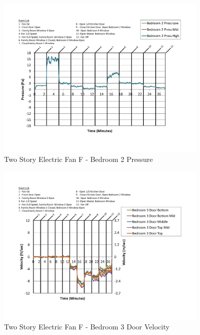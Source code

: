 \documentclass{article}
\begin{document}
\begin{appendices}
	\begin{figure}[H]
		\centering
		\includegraphics[height=3.05in,trim=0.67in 1.1in 0.67in 0.8in,clip=true]{0_Images/Results_Charts/ColdFlow/Two_Story/Electric/F/Bedroom_2_Pressure.pdf}
		\caption{Two Story Electric Fan F - Bedroom 2 Pressure}
	\end{figure}
 

	\begin{figure}[H]
		\centering
		\includegraphics[height=3.05in,trim=0.67in 1.1in 0.67in 0.8in,clip=true]{0_Images/Results_Charts/ColdFlow/Two_Story/Electric/F/Bedroom_3_Door_Velocity.pdf}
		\caption{Two Story Electric Fan F - Bedroom 3 Door Velocity}
	\end{figure}
 
	\clearpage


\end{appendices}
\end{document}
